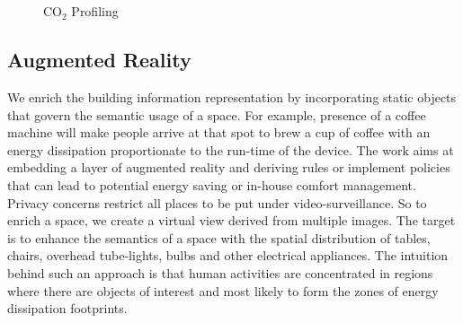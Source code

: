 \begin{figure}
     \centering
     \\
     \\
      \caption{CO$_2$ Profiling}%
    \label{fig:co2Variation}%
\end{figure}

\subsection{Augmented Reality}
 
We enrich the building information representation by incorporating static objects that govern the semantic usage of a space. For example, presence of a coffee machine will make people arrive at that spot to brew a cup of coffee with an energy dissipation proportionate to the run-time of the device. The work aims at embedding a layer of augmented reality and deriving rules or implement policies that can lead to potential energy saving or in-house comfort management. Privacy concerns restrict all places to be put under video-surveillance. So to enrich a space, we create a virtual view derived from multiple images. The target is to enhance the semantics of a space with the spatial distribution of tables, chairs, overhead tube-lights, bulbs and other electrical appliances. The intuition behind such an approach is that human activities are concentrated in regions where there are objects of interest and most likely to form the zones of energy dissipation footprints. 


